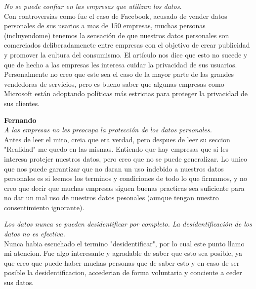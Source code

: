 \documentclass[12pt,a4paper]{article}
\begin{document}
\begin{enumerate}
\begin{enumerate}
				\textit {No se puede confiar en las empresas que utilizan los datos.}\\
				
        			Con controversias como fue el caso de Facebook, acusado de vender 
				datos personales de sus usarios a mas de 150 empresas, muchas personas (incluyendome) 
				tenemos la sensación de que nuestros datos personales son comerciados deliberadamenete 
				entre empresas con el objetivo de crear publicidad y promover la cultura del consumismo. 
				El artículo nos dice que esto no sucede y que de hecho a las empresas les interesa cuidar 
				la privacidad de sus usuarios. Personalmente no creo que este sea el caso de la mayor 
				parte de las grandes vendedoras de servicios, pero es bueno saber que algunas empresas 
				como Microsoft están adoptando políticas más estrictas para proteger la privacidad de 
				sus clientes.
				
				\textbf{Fernando}\\
				\textit {A las empresas no les preocupa la protección de los datos personales.} \\

				Antes de leer el mito, creia que era verdad, pero despues de leer su seccion "Realidad" me quedo en las mismas.
				Entiendo que hay empresas que si les interesa protejer nuestros datos, pero creo que no se puede generalizar. Lo unico que
				nos puede garantizar que no daran un uso indebido a nuestros datos personales es si leemos los terminos y condiciones de
				todo lo que firmamos, y no creo que decir que muchas empresas siguen buenas practicas sea suficiente para no dar un mal 
				uso de nuestros datos pesonales (aunque tengan nuestro consentimiento ignorante).


				\textit {Los datos nunca se pueden desidentificar por completo. La desidentificación de los datos no es efectiva.} \\

				Nunca habia escuchado el termino "desidentificar", por lo cual este punto llamo mi atencion.
				Fue algo interesante y agradable de saber que esto sea posible, ya que creo que puede haber muchas personas que de saber 
				esto y en caso de ser posible la desidentificacion, accederian de forma voluntaria y conciente a ceder sus datos.
				
		\end{enumerate}

\end{enumerate}
\end{document}
